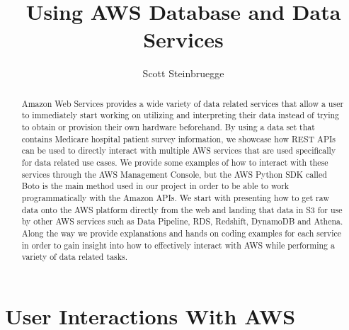 
\title{Using AWS Database and Data Services}

\author{Scott Steinbruegge}

\renewcommand{\shortauthors}{S. Steinbruegge}

\begin{abstract}
Amazon Web Services provides a wide variety of data related services that 
allow a user to immediately start working on utilizing and interpreting their 
data instead of trying to obtain or provision their own hardware beforehand. 
By using a data set that contains Medicare hospital patient survey 
information, we showcase how REST APIs can be used to directly interact with 
multiple AWS services that are used specifically for data related use cases. 
We provide some examples of how to interact with these services 
through the AWS Management Console, but the AWS Python SDK called Boto is the 
main method used in our project in order to be able to work programmatically 
with the Amazon APIs. We start with presenting how to get raw data onto the 
AWS platform directly from the web and landing that data in S3 for use by 
other AWS services such as Data Pipeline, RDS, Redshift, DynamoDB and Athena. 
Along the way we provide explanations and hands on coding examples for each 
service in order to gain insight into how to effectively interact with AWS 
while performing a variety of data related tasks. 
\end{abstract}


\maketitle

\section{User Interactions With AWS}

